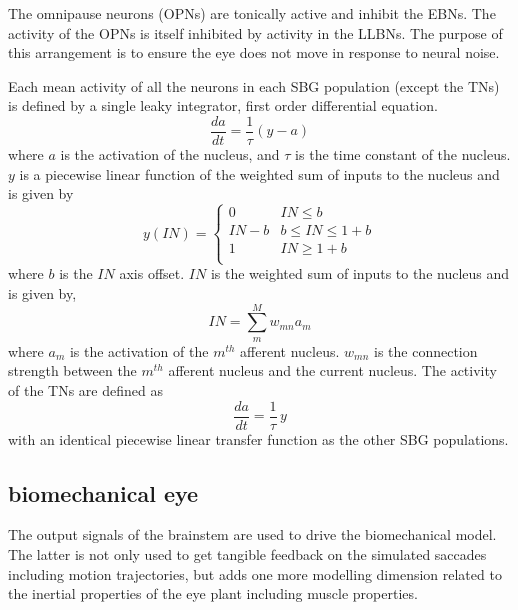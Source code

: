 \documentclass{frontiersSCNS}
\begin{document}
The omnipause neurons (OPNs) are tonically active and inhibit the EBNs.
The activity of the OPNs is itself inhibited by activity in the LLBNs.
The purpose of this arrangement is to ensure the eye does not move in
response to neural noise.

Each mean activity of all the neurons in each SBG population (except the
TNs) is defined by a single leaky integrator, first order differential equation.
\begin{equation}\label{eq:LIN}
   \frac{da}{dt} = \frac{1}{\tau}(y-a)
\end{equation}
where $a$ is the activation of the nucleus, and $\tau$ is the time constant
of the nucleus. $y$ is a piecewise linear function of the weighted sum of
inputs to the nucleus and is given by
\begin{equation}
       y(IN) = \begin{cases}
       0    & IN \leq b \\
      IN-b   & b \leq IN \leq 1+b \\
      1   & IN \geq 1+b \\
   \end{cases}
\end{equation}
where $b$ is the $IN$ axis offset.  $IN$ is the weighted sum of inputs to
the nucleus and is given by,
\begin{equation}
    IN = \sum_{m}^{M} w_{mn} a_{m}
\end{equation}
where $a_{m}$ is the activation of the $m^{th}$ afferent nucleus.
$w_{mn}$ is the connection strength between the $m^{th}$ afferent nucleus
and the current nucleus. The activity of the TNs are defined as
\begin{equation}
   \frac{da}{dt} = \frac{1}{\tau}\,y
\end{equation}
with an identical piecewise linear transfer function as the other SBG populations.

\subsection{biomechanical eye}

The output signals of the brainstem are used to drive the biomechanical model.
The latter is not only used to get tangible feedback on the simulated saccades
including motion trajectories, but adds one more modelling dimension related to
the inertial properties of the eye plant including muscle properties.
\end{document}
